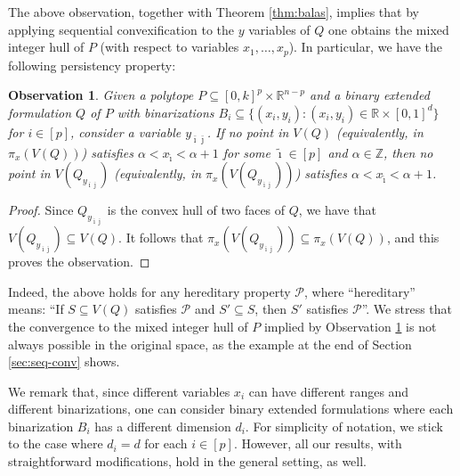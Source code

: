 \documentclass[11pt,a4paper]{article}
\newtheorem{observation}[theorem]{Observation}
\newcommand{\R}{\mathbb{R}}
\newcommand{\Z}{\mathbb{Z}}
\newcommand{\1}{\textbf{1}}
\newcommand\marco[1]{\textcolor{red}{\textbf{ MDS:  #1}}}
\newcommand\michele[1]{\textcolor{blue}{\textbf{ MC:  #1}}}
\begin{document}
The above observation, together with Theorem \ref{thm:balas}, implies that by applying sequential convexification to the $y$ variables of $Q$ one obtains the mixed integer hull of $P$ (with respect to variables $x_1,\dots, x_p$). In particular, we have the following persistency property:


\begin{observation}\label{obs-persistency} %
Given a polytope $P\subseteq [0,k]^p\times \R^{n-p}$ and a binary extended formulation $Q$ of $P$ 
with binarizations $B_i\subseteq\{(x_i,y_i):(x_i,y_i)\in \R\times [0,1]^d\}$ for $i\in [p]$, consider a variable $y_{\bar{\imath}\bar{\jmath}}$. If no point in $V(Q)$ (equivalently, in $\pi_x(V(Q))$) %
satisfies  $\alpha <x_{\tilde \imath}<\alpha +1$ for some $\tilde{\imath}\in [p]$ and $\alpha\in\Z$, then no point in $
V(Q_{y_{\bar{\imath}\bar{\jmath}}})$ (equivalently, in $\pi_x(
V(Q_{y_{\bar{\imath}\bar{\jmath}}}))$) satisfies  $\alpha <x_{\tilde\imath}<\alpha +1$. 
\end{observation}

\begin{proof}  Since  $Q_{y_{\bar{\imath}\bar{\jmath}}}$ is the convex hull of two faces of $Q$, we have that $V(Q_{y_{\bar{\imath}\bar{\jmath}}})\subseteq V(Q)$. It follows that   $\pi_x(V(Q_{y_{\bar{\imath}\bar{\jmath}}}))\subseteq \pi_x(V(Q))$, and this proves the observation. \end{proof}

Indeed, the above holds for any hereditary property $\mathcal P$, where ``hereditary'' means: ``If $S\subseteq V(Q)$ satisfies  $\mathcal P$ and $S'
\subseteq S$, then $S'$ satisfies  $\mathcal P$''. We stress that the convergence to the mixed integer hull of $P$ implied by Observation \ref{obs-persistency} is not always possible in the original space, as the example at the end of Section \ref{sec:seq-conv} shows.

We remark that, since different variables $x_i$ can have different ranges and different binarizations, one can consider binary extended formulations where each binarization $B_i$ has a different dimension $d_i$. For simplicity of notation, we stick to the case where $d_i=d$ for each $i\in[p]$. However, all our results, with straightforward modifications, hold in the general setting, as well.




\end{document}
